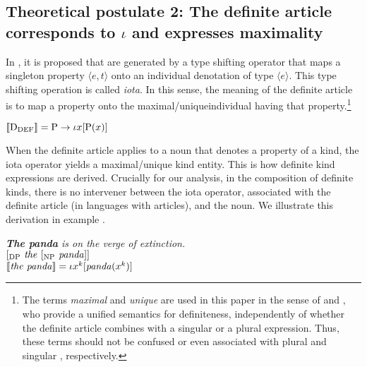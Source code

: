 \documentclass[output=paper
,modfonts
,nonflat]{langsci/langscibook}
\begin{document}
	\subsection[Theoretical postulate 2: The definite article corresponds to ι and expresses maximality]{Theoretical postulate 2: The definite article corresponds to $\iota$ and expresses maximality}
	
	In \citet{Partee1987}, it is proposed that  are generated by a type shifting operator that maps a singleton property $\langle e, t\rangle$ onto an individual denotation of type $\langle e\rangle$. This type shifting operation is called \textit{iota}. In this sense, the meaning of the definite article is to map a property onto the maximal/unique\largerpage individual having that property.\footnote{The terms \textit{maximal} and \textit{unique} are used in this paper in the sense of \citet{Sharvy1980} and \citet{Link1983}, who provide a unified semantics for definiteness, independently of whether the definite article combines with a singular or a plural expression. Thus, these terms should not be confused or even associated with plural and singular , respectively.}
	
	\ea \label{ex:borik:6}
	$[\![\mbox{D}_{\mbox{\scriptsize{DEF}}}]\!] = \mbox{P} \rightarrow \iota{x} [\mbox{P}(x)]$
	\z
	
	When the definite article applies to a noun that denotes a property of a kind, the iota operator yields a maximal/unique kind entity. This is how definite kind expressions are derived. Crucially for our analysis, in the composition of definite kinds, there is no intervener between the iota operator, associated with the definite article (in languages with articles), and the noun. We illustrate this derivation in example . 
	
	\ea\label{ex:borik:7}
	\ea\label{ex:borik:7a}
	\textit{
		\textbf{The panda} is on the verge of extinction.} \\
	\ex\label{ex:borik:7b}
	$[_{\mbox{\scriptsize{DP}}} \mbox{\textit{ the }} [_{\mbox{\scriptsize{NP}}} \mbox{\textit{ panda}} ]]$\\
	\ex\label{ex:borik:7c}
	$[\![\mbox{\textit{the panda}}]\!] = \iota{x^k} [\mbox{\textit{panda}}(x^k)]$
	\z
	\z
	
\end{document}

